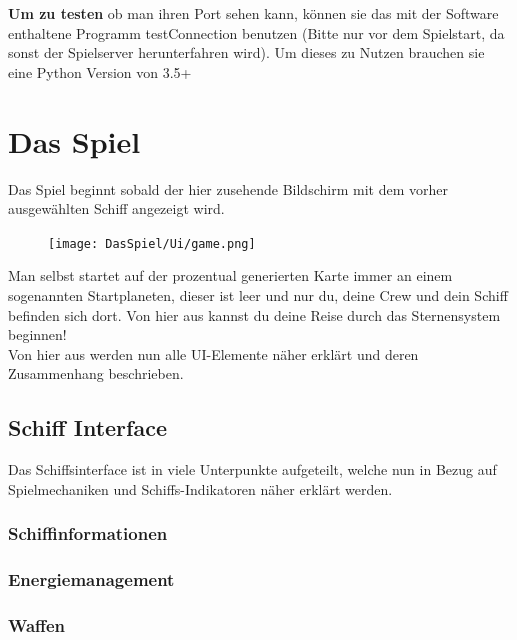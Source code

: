 \documentclass[fontsize=12pt,paper=a4,twoside]{scrartcl}
\begin{document}
\textbf{Um zu testen} ob man ihren Port sehen kann, können sie das mit der Software enthaltene Programm testConnection benutzen (Bitte nur vor dem Spielstart, da sonst der Spielserver herunterfahren wird). Um dieses zu Nutzen brauchen sie eine Python Version von 3.5+ 


\section{Das Spiel}
Das Spiel beginnt sobald der hier zusehende Bildschirm mit dem vorher ausgewählten Schiff angezeigt wird. 
\begin{figure}[H]
\centering
\texttt{[image: DasSpiel/Ui/game.png]}
\end{figure} 

Man selbst startet auf der prozentual generierten Karte immer an einem sogenannten Startplaneten, dieser ist leer und nur du, deine Crew und dein Schiff befinden sich dort. Von hier aus kannst du deine Reise durch das Sternensystem beginnen!  
\\
Von hier aus werden nun alle UI-Elemente näher erklärt und deren Zusammenhang beschrieben.


\subsection{Schiff Interface}

Das Schiffsinterface ist in viele Unterpunkte aufgeteilt, welche nun in Bezug auf Spielmechaniken und Schiffs-Indikatoren näher erklärt werden.



\subsubsection{Schiffinformationen}



\subsubsection{Energiemanagement}


\subsubsection{Waffen}
\end{document}
